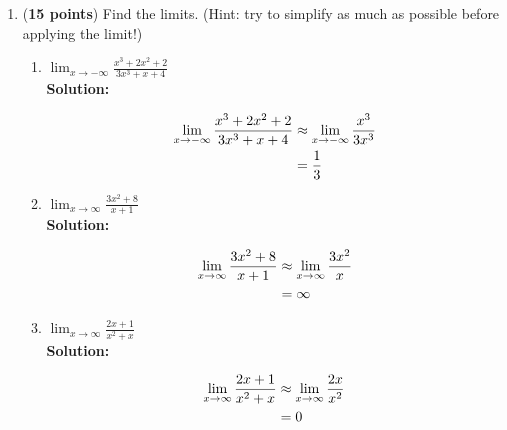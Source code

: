 \documentclass[a4paper]{article}
\begin{document}
\begin{enumerate}

\item (\textbf{15 points}) Find the limits. (Hint: try to simplify as much as possible before applying the limit!)


\begin{enumerate}
	\item $\lim_{x \to -\infty} \frac{x^3 + 2x^2 + 2}{3x^3 + x + 4}$\\
	\textbf{Solution:}\\
	
		
		\begin{align*}
		\lim_{x \to -\infty} \frac{x^3 + 2x^2 + 2}{3x^3 + x + 4} &\approx \lim_{x \to -\infty} \frac{x^3}{3x^3}\notag\\
		&= \frac{1}{3}\notag
		\end{align*}
		
		
	\item $\lim_{x \to \infty} \frac{3x^2 + 8}{x + 1}$\\
	\textbf{Solution:}\\
	
	
		\begin{align*}
		\lim_{x \to \infty} \frac{3x^2 + 8}{x + 1} &\approx \lim_{x \to \infty} \frac{3x^2}{x}\notag\\
		&= \infty\notag
		\end{align*}
	
	
	\item $\lim_{x \to \infty} \frac{2x + 1}{x^2 + x}$\\
	\textbf{Solution:}\\
	
	
	
		\begin{align*}
		\lim_{x \to \infty} \frac{2x + 1}{x^2 + x} &\approx \lim_{x \to \infty} \frac{2x}{x^2}\notag\\
		&= 0\notag
		\end{align*}	
	

\end{enumerate}
\end{enumerate}
\end{document}
